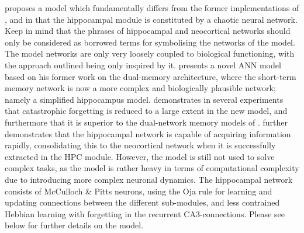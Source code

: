 \cite{Hattori2010} proposes a model which fundamentally differs from the former implementations of \cite{French1997, French2001}, and \cite{Ans1997} in that the hippocampal module is constituted by a chaotic neural network. Keep in mind that the phrases of hippocampal and neocortical networks should only be considered as borrowed terms for symbolising the networks of the model. The model networks are only very loosely coupled to biological functioning, with the approach outlined being only inspired by it.
\cite{Hattori2014} presents a novel ANN model based on his former work on the dual-memory architecture, where the short-term memory network is now a more complex and biologically plausible network; namely a simplified hippocampus model. \cite{Hattori2014} demonstrates in several experiments that catastrophic forgetting is reduced to a large extent in the new model, and furthermore that it is superior to the dual-network memory models of \cite{Ans1997, French1997, Hattori2010}. \cite{Hattori2014} further demonstrates that the hippocampal network is capable of acquiring information rapidly, consolidating this to the neocortical network when it is successfully extracted in the HPC module.
However, the model is still not used to solve complex tasks, as the model is rather heavy in terms of computational complexity due to introducing more complex neuronal dynamics. The hippocampal network consists of McCulloch \& Pitts neurons, using the Oja rule for learning and updating connections between the different sub-modules, and less contrained Hebbian learning with forgetting in the recurrent CA3-connections. Please see below for further details on the model.
